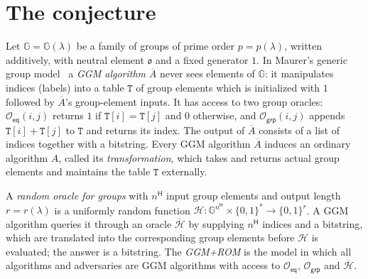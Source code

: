 \documentclass{conjura-conjecture}
\newcommand{\GG}{\mathbb{G}}
\newcommand{\HH}{\mathcal{H}}
\newcommand{\Oeq}{\mathcal{O}_{\mathsf{eq}}}
\newcommand{\Ogrp}{\mathcal{O}_{\mathsf{grp}}}
\begin{document}
\section{The conjecture}\label{sec:conjectures}

\begin{definition}\label{def:ggmrom}
Let $\GG=\GG(\lambda)$ be a family of groups of prime order
$p=p(\lambda)$, written additively, with neutral element $\mathfrak{o}$
and a fixed generator $\mathfrak{1}$. In Maurer's generic group
model~\cite{Mau05} a \emph{GGM algorithm} $\overline{A}$ never sees
elements of $\GG$: it manipulates indices (labels) into a table
$\mathtt{T}$ of group elements which is initialized with $\mathfrak{1}$
followed by $\overline{A}$'s group-element inputs. It has access to two
group oracles: $\Oeq(i,j)$ returns $1$ if $\mathtt{T}[i]=\mathtt{T}[j]$
and $0$ otherwise, and $\Ogrp(i,j)$ appends $\mathtt{T}[i]+\mathtt{T}[j]$
to $\mathtt{T}$ and returns its index. The output of $\overline{A}$
consists of a list of indices together with a bitstring. Every GGM
algorithm $\overline{A}$ induces an ordinary algorithm $A$, called its
\emph{transformation}, which takes and returns actual group elements and
maintains the table $\mathtt{T}$ externally.

A \emph{random oracle for groups} with $n^{\mathsf{H}}$ input group
elements and output length $r=r(\lambda)$ is a uniformly random function
$\HH:\GG^{n^{\mathsf{H}}}\times\{0,1\}^{*}\to\{0,1\}^{r}$. A GGM
algorithm queries it through an oracle $\overline{\HH}$ by supplying
$n^{\mathsf{H}}$ indices and a bitstring, which are translated into the
corresponding group elements before $\HH$ is evaluated; the answer is a
bitstring. The \emph{GGM+ROM} is the model in which all algorithms and
adversaries are GGM algorithms with access to $\Oeq$, $\Ogrp$ and
$\overline{\HH}$.
\end{definition}
\end{document}
